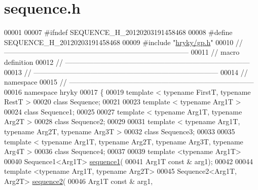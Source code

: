\hypertarget{sequence_8h_source}{\section{sequence.\-h}
}

\begin{DoxyCode}
00001 
00007 \textcolor{preprocessor}{#ifndef SEQUENCE\_H\_20120203191458468}
00008 \textcolor{preprocessor}{}\textcolor{preprocessor}{#define SEQUENCE\_H\_20120203191458468}
00009 \textcolor{preprocessor}{}\textcolor{preprocessor}{#include "\hyperlink{gp_8h}{hryky/gp.h}"}
00010 \textcolor{comment}{//
      ------------------------------------------------------------------------------}
00011 \textcolor{comment}{// macro definition}
00012 \textcolor{comment}{//
      ------------------------------------------------------------------------------}
00013 \textcolor{comment}{//
      ------------------------------------------------------------------------------}
00014 \textcolor{comment}{// namespace}
00015 \textcolor{comment}{//
      ------------------------------------------------------------------------------}
00016 \textcolor{keyword}{namespace }hryky
00017 \{
00019     \textcolor{keyword}{template} < \textcolor{keyword}{typename} FirstT, \textcolor{keyword}{typename} RestT >
00020     \textcolor{keyword}{class }Sequence;
00021     
00023     \textcolor{keyword}{template} < \textcolor{keyword}{typename} Arg1T >
00024     \textcolor{keyword}{class }Sequence1;
00025 
00027     \textcolor{keyword}{template} < \textcolor{keyword}{typename} Arg1T, \textcolor{keyword}{typename} Arg2T >
00028     \textcolor{keyword}{class }Sequence2;
00029 
00031     \textcolor{keyword}{template} < \textcolor{keyword}{typename} Arg1T, \textcolor{keyword}{typename} Arg2T, \textcolor{keyword}{typename} Arg3T >
00032     \textcolor{keyword}{class }Sequence3;
00033 
00035     \textcolor{keyword}{template} < \textcolor{keyword}{typename} Arg1T, \textcolor{keyword}{typename} Arg2T, \textcolor{keyword}{typename} Arg3T, \textcolor{keyword}{typename} Arg4T >
00036     \textcolor{keyword}{class }Sequence4;
00037 
00039     \textcolor{keyword}{template} <\textcolor{keyword}{typename} Arg1T>
00040     Sequence1<Arg1T> \hyperlink{namespacehryky_a7f53e66b99b4eadc301227b9330ff1af}{sequence1}(
00041         Arg1T \textcolor{keyword}{const} & arg1);
00042 
00044     \textcolor{keyword}{template} <\textcolor{keyword}{typename} Arg1T, \textcolor{keyword}{typename} Arg2T>
00045     Sequence2<Arg1T, Arg2T> \hyperlink{namespacehryky_af306f38c62df81dd0dc791c0ee2665b2}{sequence2}(
00046         Arg1T \textcolor{keyword}{const} & arg1,

\end{DoxyCode}
